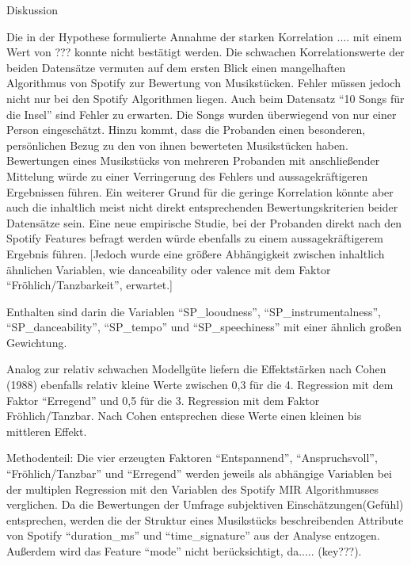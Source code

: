 Diskussion

Die in der Hypothese formulierte Annahme der starken Korrelation .... mit einem Wert von ??? konnte nicht bestätigt werden.
Die schwachen Korrelationswerte der beiden Datensätze vermuten auf dem ersten Blick einen mangelhaften Algorithmus von Spotify zur Bewertung von Musikstücken.
Fehler müssen jedoch nicht nur bei den Spotify Algorithmen liegen.
Auch beim Datensatz ``10 Songs für die Insel'' sind Fehler zu erwarten.
Die Songs wurden überwiegend von nur einer Person eingeschätzt.
Hinzu kommt, dass die Probanden einen besonderen, persönlichen Bezug zu den von ihnen bewerteten Musikstücken haben.
Bewertungen eines Musikstücks von mehreren Probanden mit anschließender Mittelung würde zu einer Verringerung des Fehlers und aussagekräftigeren Ergebnissen führen.
Ein weiterer Grund für die geringe Korrelation könnte aber auch die inhaltlich meist nicht direkt entsprechenden Bewertungskriterien beider Datensätze sein.
Eine neue empirische Studie, bei der Probanden direkt nach den Spotify Features befragt werden würde ebenfalls zu einem aussagekräftigerem Ergebnis führen.
[Jedoch wurde eine größere Abhängigkeit zwischen inhaltlich ähnlichen Variablen, wie danceability oder valence mit dem Faktor ``Fröhlich/Tanzbarkeit'', erwartet.]
 

     


Enthalten sind darin die Variablen ``SP\_looudness'', ``SP\_instrumentalness'', ``SP\_danceability'', ``SP\_tempo'' und ``SP\_speechiness'' mit einer ähnlich großen Gewichtung.

Analog zur relativ schwachen Modellgüte liefern die Effektstärken nach Cohen (1988) ebenfalls relativ kleine Werte zwischen 0,3 für die 4. Regression mit dem Faktor ``Erregend'' und 0,5 für die 3.
Regression mit dem Faktor Fröhlich/Tanzbar.
Nach Cohen entsprechen diese Werte einen kleinen bis mittleren Effekt.


Methodenteil: Die vier erzeugten Faktoren ``Entspannend'', ``Anspruchsvoll'', ``Fröhlich/Tanzbar'' und ``Erregend'' werden jeweils als abhängige Variablen bei der multiplen Regression mit den Variablen des Spotify MIR Algorithmusses verglichen.
Da die Bewertungen der Umfrage subjektiven Einschätzungen(Gefühl) entsprechen, werden die der Struktur eines Musikstücks beschreibenden Attribute von Spotify ``duration\_ms'' und ``time\_signature'' aus der Analyse entzogen.
Außerdem wird das Feature ``mode'' nicht berücksichtigt, da..... (key???).
